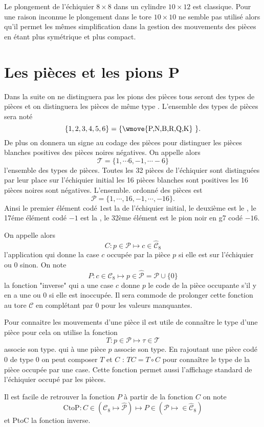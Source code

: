 \documentclass[11pt]{article}
\newcommand{\PP}{{\mathcal{P}}}
\newcommand{\TT}{{\mathcal{T}}}
\newcommand{\CC}{{\mathcal{C}}}
\begin{document}
 Le plongement de l'échiquier $8 \times 8$ dans un cylindre $10 \times 12$ est classique. Pour une raison inconnue le plongement dans le tore $10\times 10$ ne semble pas utilisé alors qu'il permet les mêmes simplification dans la gestion des mouvements des pièces  en étant plus symétrique et plus compact.
\section{Les pièces  et les pions P }
Dans la suite on ne distinguera pas les pions des pièces tous seront des types de pièces et on distinguera les pièces de même type .  L'ensemble des types de pièces sera noté $$\{1,2,3,4,5,6\}=\{\mbox{\wmove{P,N,B,R,Q,K} }\}.$$ De plus on donnera un signe au codage des pièces pour distinguer les pièces blanches positives des pièces noires négatives. On appelle alors $$\TT=\{1,\cdots 6, -1,\cdots -6\}$$ l'ensemble des types de pièces. Toutes les 32 pièces de l'échiquier sont distinguées par leur place sur l'échiquier initial les  16 pièces blanches sont positives les 16 pièces noires sont négatives. L'ensemble. ordonné  des pièces est $$\PP=\{1, \cdots ,16, -1 ,\cdots, -16\}.$$ Ainsi  le premier élément codé $1 $est la    de l'échiquier initial, le deuxième  est  le , le 17éme élément codé $-1$ est la  , le 32ème élément est le pion noir en g7  codé $-16$.

On appelle alors $$C : p\in \PP \mapsto c\in\hat{\CC}_8 $$ l'application qui donne la case $c$ occupée par  la pièce $p$ si elle est sur l'échiquier  ou $0$ sinon.
On note $$P :c \in\CC_8\mapsto p\in \hat{\PP }=\PP\cup \{0\}$$  la fonction "inverse" qui a une case $c$ donne  $p$ le code de la pièce occupante s'il y en a une ou $0$ si elle est inoccupée. Il sera  commode de prolonger cette fonction au tore $\CC$ en complétant par $0$
pour les valeurs manquantes.

Pour connaitre les mouvements d'une pièce il est utile de connaître le type d'une pièce pour cela on utilise la fonction
$$T: p\in\PP\mapsto \tau\in \TT$$ associe son type.
qui à une pièce $p$ associe son type. En rajoutant une pièce codé $0$ de type $0$ on peut composer $T$  et $C$ : $TC=T\circ C$ pour connaître
le type de la pièce occupée par une case. Cette fonction permet aussi l'affichage standard de l'échiquier occupé par les pièces.

Il est facile de retrouver la fonction $P$ à partir de la fonction $C$  on note
$$\mbox{CtoP}: C\in( \CC_8 \mapsto \hat{\PP } )\mapsto P\in (\PP \mapsto \in\hat{\CC}_8 )$$ et PtoC la fonction inverse.
\end{document}
